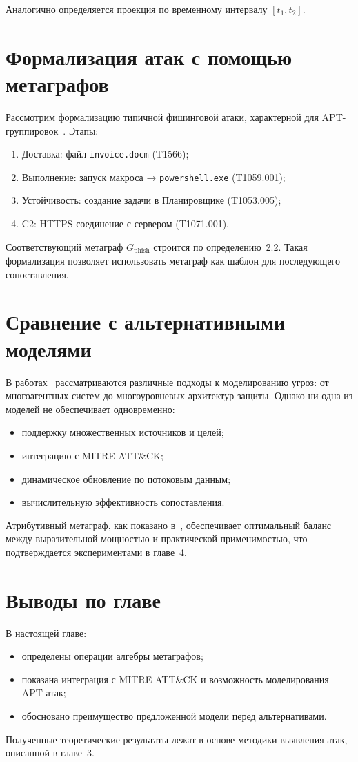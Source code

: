 Аналогично определяется проекция по временному интервалу $[t_1, t_2]$.

\section{Формализация атак с помощью метаграфов}

Рассмотрим формализацию типичной фишинговой атаки, характерной для APT-группировок~\cite{Latypov2020}. Этапы:
\begin{enumerate}
    \item Доставка: файл \texttt{invoice.docm} (T1566);
    \item Выполнение: запуск макроса → \texttt{powershell.exe} (T1059.001);
    \item Устойчивость: создание задачи в Планировщике (T1053.005);
    \item C2: HTTPS-соединение с сервером (T1071.001).
\end{enumerate}

Соответствующий метаграф $G_{\mathrm{phish}}$ строится по определению~2.2. Такая формализация позволяет использовать метаграф как шаблон для последующего сопоставления.

\section{Сравнение с альтернативными моделями}

В работах~\cite{Novokhrestov2014,Zegzhda2016,Kotenko2013,Gorbachev2018} рассматриваются различные подходы к моделированию угроз: от многоагентных систем до многоуровневых архитектур защиты. Однако ни одна из моделей не обеспечивает одновременно:
\begin{itemize} 
\item поддержку множественных источников и целей;
    \item интеграцию с MITRE ATT\&CK;
    \item динамическое обновление по потоковым данным;
    \item вычислительную эффективность сопоставления.
\end{itemize}
Атрибутивный метаграф, как показано в~\cite{Latypov2020}, обеспечивает оптимальный баланс между выразительной мощностью и практической применимостью, что подтверждается экспериментами в главе~4.

\section{Выводы по главе}

В настоящей главе:
\begin{itemize}
    \item определены операции алгебры метаграфов;
    \item показана интеграция с MITRE ATT\&CK и возможность моделирования APT-атак;
    \item обосновано преимущество предложенной модели перед альтернативами.
\end{itemize}   
Полученные теоретические результаты лежат в основе методики выявления атак, описанной в главе~3.